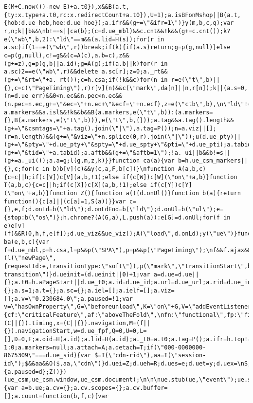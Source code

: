 \documentclass[
]{article}
\begin{document}
\begin{verbatim}
E(M+C.now())-new E)+a.t0}),x&&B(a.t,{ty:x.type+a.t0,rc:x.redirectCount+a.t0}),U=1);a.isBFonMshop||B(a.t,{hob:d.ue_hob,hoe:d.ue_hoe});a.ifr&&(g+=\"&ifr=1\")}y(m,b,c,q);var r,n;k||b&&\nb!==s||ca(b);(c=d.ue_mbl)&&c.cnt&&!k&&(g+=c.cnt());k?e(\"wb\",b,2):\"ld\"==m&&(a.lid=H(s));for(r in a.sc)if(1==e(\"wb\",r))break;if(k){if(a.s)return;g=p(g,null)}else c=p(g,null),c!=g&&(c=A(c),a.b=c),z&&(g+=z),g=p(g,b||a.id);g=A(g);if(a.b||k)for(r in a.sc)2==e(\"wb\",r)&&delete a.sc[r];z=0;a._rt&&(g+=\"&rt=\"+a._rt());c=h.csa;if(!k&&c)for(n in r=e(\"t\",b)||{},c=c(\"PageTiming\"),r)r[v](n)&&c(\"mark\",da[n]||n,r[n]);k||(a.s=0,(n=d.ue_err)&&0<n.ec&&n.pec<n.ec&&(n.pec=n.ec,g+=\"&ec=\"+n.ec+\"&ecf=\"+n.ecf),z=e(\"ctb\",b),\n\"ld\"!==m||b||a.markers?a.markers&&a.isl&&!k&&b&&B(a.markers,e(\"t\",b)):(a.markers={},B(a.markers,e(\"t\",b))),e(\"t\",b,{}));a.tag&&a.tag().length&&(g+=\"&csmtags=\"+a.tag().join(\"|\"),a.tag=P());n=a.viz||[];(r=n.length)&&(g+=\"&viz=\"+n.splice(0,r).join(\"|\"));u(d.ue_pty)||(g+=\"&pty=\"+d.ue_pty+\"&spty=\"+d.ue_spty+\"&pti=\"+d.ue_pti);a.tabid&&(g+=\"&tid=\"+a.tabid);a.aftb&&(g+=\"&aftb=1\");!a._ui||b&&b!=s||(g+=a._ui());a.a=g;l(g,m,z,k)}}function ca(a){var b=h.ue_csm_markers||{},c;for(c in b)b[v](c)&&y(c,a,F,b[c])}\nfunction A(a,b,c){c=c||h;if(c[V])c[V](a,b,!1);else if(c[W])c[W](\"on\"+a,b)}function T(a,b,c){c=c||h;if(c[X])c[X](a,b,!1);else if(c[Y])c[Y](\"on\"+a,b)}function Z(){function a(){d.onUl()}function b(a){return function(){c[a]||(c[a]=1,S(a))}}var c={},e,f;d.onLd=b(\"ld\");d.onLdEnd=b(\"ld\");d.onUl=b(\"ul\");e={stop:b(\"os\")};h.chrome?(A(G,a),L.push(a)):e[G]=d.onUl;for(f in e)e[v](f)&&R(0,h,f,e[f]);d.ue_viz&&ue_viz();A(\"load\",d.onLd);y(\"ue\")}function ba(e,b,c){var f=d.ue_mbl,p=h.csa,l=p&&p(\"SPA\"),p=p&&p(\"PageTiming\");\nf&&f.ajax&&f.ajax(b,c);l&&p&&(l(\"newPage\",{requestId:e,transitionType:\"soft\"}),p(\"mark\",\"transitionStart\",b));a.tag(\"ajax-transition\")}d.ueinit=(d.ueinit||0)+1;var a=d.ue=d.ue||{};a.t0=h.aPageStart||d.ue_t0;a.id=d.ue_id;a.url=d.ue_url;a.rid=d.ue_id;a.a=\"\";a.b=\"\";a.h={};a.s=1;a.t={};a.sc={};a.iel=[];a.ielf=[];a.viz=[];a.v=\"0.230684.0\";a.paused=!1;var v=\"hasOwnProperty\",G=\"beforeunload\",K=\"on\"+G,V=\"addEventListener\",X=\"removeEventListener\",W=\"attachEvent\",Y=\"detachEvent\",da={cf:\"criticalFeature\",af:\"aboveTheFold\",\nfn:\"functional\",fp:\"firstPaint\",fcp:\"firstContentfulPaint\",bb:\"bodyBegin\",be:\"bodyEnd\",ld:\"loaded\"},E=h.Date,C=h.performance||h.webkitPerformance,f=(C||{}).timing,x=(C||{}).navigation,M=(f||{}).navigationStart,w=d.ue_fpf,Q=0,U=0,L=[],D=0,F;a.oid=H(a.id);a.lid=H(a.id);a._t0=a.t0;a.tag=P();a.ifr=h.top!==h.self||h.frameElement?1:0;a.markers=null;a.attach=A;a.detach=T;if(\"000-0000000-8675309\"===d.ue_sid){var $=I(\"cdn-rid\"),aa=I(\"session-id\");$&&aa&&O($,aa,\"cdn\")}d.uei=Z;d.ueh=R;d.ues=e;d.uet=y;d.uex=\nS;a.reset=O;a.pause=function(d){a.paused=d};Z()})(ue_csm,ue_csm.window,ue_csm.document);\n\n\nue.stub(ue,\"event\");ue.stub(ue,\"onSushiUnload\");ue.stub(ue,\"onSushiFlush\");\n\nue.stub(ue,\"log\");ue.stub(ue,\"onunload\");ue.stub(ue,\"onflush\");\n(function(b){var a=b.ue;a.cv={};a.cv.scopes={};a.cv.buffer=[];a.count=function(b,f,c){var 
\end{verbatim}
\end{document}
